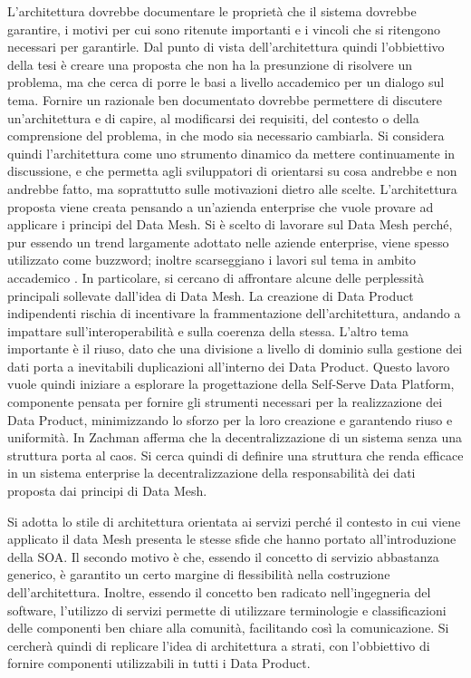 \documentclass[12pt]{report}
\begin{document}
L'architettura dovrebbe documentare le proprietà che il sistema dovrebbe garantire, i motivi per cui sono ritenute importanti e i vincoli che si ritengono necessari per garantirle.
Dal punto di vista dell'architettura quindi l'obbiettivo della tesi è creare una proposta che non ha la presunzione di risolvere un problema, ma che cerca di porre le basi a livello accademico per un dialogo sul tema. 
Fornire un razionale ben documentato dovrebbe permettere di discutere un'architettura e di capire, al modificarsi dei requisiti, del contesto o della comprensione del problema, in che modo sia necessario cambiarla.
Si considera quindi l'architettura come uno strumento dinamico da mettere continuamente in discussione, e che permetta agli sviluppatori di orientarsi su cosa andrebbe e non andrebbe fatto, ma soprattutto sulle motivazioni dietro alle scelte.
L'architettura proposta viene creata pensando a un'azienda enterprise che vuole provare ad applicare i principi del Data Mesh.
Si è scelto di lavorare sul Data Mesh perché, pur essendo un trend largamente adottato nelle aziende enterprise, viene spesso utilizzato come buzzword; inoltre scarseggiano i lavori sul tema in ambito accademico \cite{goedegebuure2023data}.
In particolare, si cercano di affrontare alcune delle perplessità principali sollevate dall'idea di Data Mesh.
La creazione di Data Product indipendenti rischia di incentivare la frammentazione dell'architettura, andando a impattare sull'interoperabilità e sulla coerenza della stessa.
L'altro tema importante è il riuso, dato che una divisione a livello di dominio sulla gestione dei dati porta a inevitabili duplicazioni all'interno dei Data Product.
Questo lavoro vuole quindi iniziare a esplorare la progettazione della Self-Serve Data Platform, componente pensata per fornire gli strumenti necessari per la realizzazione dei Data Product, minimizzando lo sforzo per la loro creazione e garantendo riuso e uniformità.
In \cite{zachman1987framework} Zachman afferma che la decentralizzazione di un sistema senza una struttura porta al caos. 
Si cerca quindi di definire una struttura che renda efficace in un sistema enterprise la decentralizzazione della responsabilità dei dati proposta dai principi di Data Mesh.

Si adotta lo stile di architettura orientata ai servizi perché il contesto in cui viene applicato il data Mesh presenta le stesse sfide che hanno portato all'introduzione della SOA. 
Il secondo motivo è che, essendo il concetto di servizio abbastanza generico, è garantito un certo margine di flessibilità nella costruzione dell'architettura.
Inoltre, essendo il concetto ben radicato nell'ingegneria del software, l'utilizzo di servizi permette di utilizzare terminologie e classificazioni delle componenti ben chiare alla comunità, facilitando così la comunicazione.
Si cercherà quindi di replicare l'idea di architettura a strati, con l'obbiettivo di fornire componenti utilizzabili in tutti i Data Product.
\end{document}

